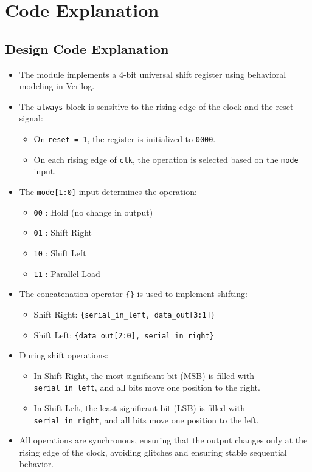 \documentclass[12pt]{article}
\begin{document}
\section{Code Explanation}

\subsection{Design Code Explanation}

\begin{itemize}
    \item The module implements a 4-bit universal shift register using behavioral modeling in Verilog.
    
    \item The \texttt{always} block is sensitive to the rising edge of the clock and the reset signal:
    \begin{itemize}
        \item On \texttt{reset = 1}, the register is initialized to \texttt{0000}.
        \item On each rising edge of \texttt{clk}, the operation is selected based on the \texttt{mode} input.
    \end{itemize}
    
    \item The \texttt{mode[1:0]} input determines the operation:
    \begin{itemize}
        \item \texttt{00} : Hold (no change in output)
        \item \texttt{01} : Shift Right
        \item \texttt{10} : Shift Left
        \item \texttt{11} : Parallel Load
    \end{itemize}
    
    \item The concatenation operator \texttt{\{\}} is used to implement shifting:
    \begin{itemize}
        \item Shift Right: \texttt{\{serial\_in\_left, data\_out[3:1]\}}
        \item Shift Left: \texttt{\{data\_out[2:0], serial\_in\_right\}}
    \end{itemize}
    
    \item During shift operations:
    \begin{itemize}
        \item In Shift Right, the most significant bit (MSB) is filled with \texttt{serial\_in\_left}, and all bits move one position to the right.
        \item In Shift Left, the least significant bit (LSB) is filled with \texttt{serial\_in\_right}, and all bits move one position to the left.
    \end{itemize}
    
    \item All operations are synchronous, ensuring that the output changes only at the rising edge of the clock, avoiding glitches and ensuring stable sequential behavior.
\end{itemize}
\end{document}

